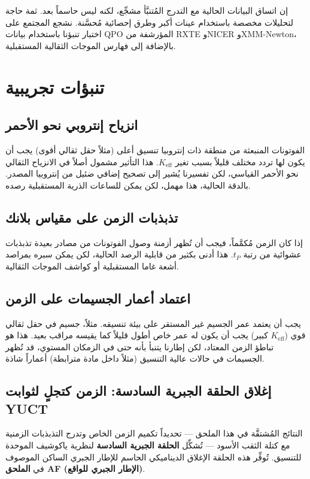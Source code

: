 \documentclass[11pt,a4paper]{article}
\newcommand{\Ke}{K_{\mathrm{eff}}}
\begin{document}
	إن اتساق البيانات الحالية مع التدرج المُتنبَّأ مشجِّع، لكنه ليس حاسماً بعد. ثمة حاجة لتحليلات مخصصة باستخدام عينات أكبر وطرق إحصائية مُحسَّنة. نشجع المجتمع على اختبار تنبؤنا باستخدام بيانات QPO المؤرشفة من RXTE وNICER وXMM-Newton، بالإضافة إلى فهارس الموجات الثقالية المستقبلية.
	
	\section{تنبؤات تجريبية}
	\label{sec:predictions}
	
	\subsection{انزياح إنتروبي نحو الأحمر}
	
	الفوتونات المنبعثة من منطقة ذات إنتروبيا تنسيق أعلى (مثلاً حقل ثقالي أقوى) يجب أن يكون لها تردد مختلف قليلاً بسبب تغير \(\Ke\). هذا التأثير مشمول أصلاً في الانزياح الثقالي نحو الأحمر القياسي، لكن تفسيرنا يُشير إلى تصحيح إضافي ضئيل من إنتروبيا المصدر. بالدقة الحالية، هذا مهمل، لكن يمكن للساعات الذرية المستقبلية رصده.
	
	\subsection{تذبذبات الزمن على مقياس بلانك}
	
	إذا كان الزمن مُكمَّماً، فيجب أن تُظهر أزمنة وصول الفوتونات من مصادر بعيدة تذبذبات عشوائية من رتبة \(t_P\). هذا أدنى بكثير من قابلية الرصد الحالية، لكن يمكن سبره بمراصد أشعة غاما المستقبلية أو كواشف الموجات الثقالية.
	
	\subsection{اعتماد أعمار الجسيمات على الزمن}
	
	يجب أن يعتمد عمر الجسيم غير المستقر على بيئة تنسيقه. مثلاً، جسيم في حقل ثقالي قوي (\(\Ke\) كبير) يجب أن يكون له عمر خاص أطول قليلاً كما يقيسه مراقب بعيد. هذا هو تباطؤ الزمن المعتاد، لكن إطارنا يتنبأ بأنه حتى في الزمكان المستوي، قد تُظهر الجسيمات في حالات عالية التنسيق (مثلاً داخل مادة مترابطة) أعماراً شاذة.
	
	\subsection{إغلاق الحلقة الجبرية السادسة: الزمن كتجلٍ لثوابت YUCT}
	
	النتائج المُشتقَّة في هذا الملحق — تحديداً تكميم الزمن الخاص وتدرج التذبذبات الزمنية مع كتلة الثقب الأسود — تُشكِّل \textbf{الحلقة الجبرية السادسة} لنظرية ياكوشيف الموحدة للتنسيق. تُوفِّر هذه الحلقة الإغلاق الديناميكي الحاسم للإطار الجبري الساكن الموصوف في \textbf{الملحق AF (الإطار الجبري للواقع)}.
	
\end{document}
